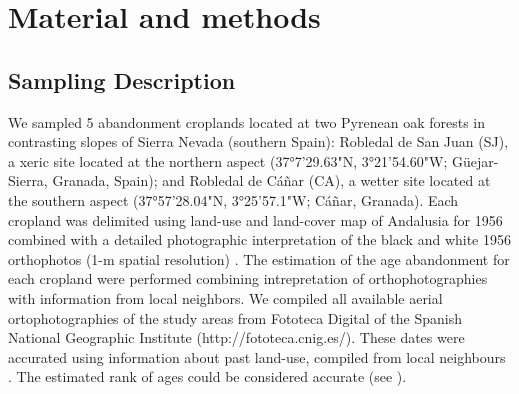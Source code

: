 \section{Material and methods}\label{sec:coloniza:MatMet}
\subsection{Sampling Description}\label{sec:coloniza:sampling}

\begin{table}
\caption{Abandonment cropland features}
\centering
{}
\label{tab:coloniza:croplands}
\end{table}

We sampled 5 abandonment croplands located at two Pyrenean oak forests in contrasting slopes of Sierra Nevada (southern Spain): Robledal de San Juan (SJ), a xeric site located at the northern aspect (37°7'29.63"N, 3°21'54.60"W; Güejar-Sierra, Granada, Spain); and Robledal de Cáñar (CA), a wetter site located at the southern aspect (37°57'28.04"N, 3°25'57.1"W; Cáñar, Granada). Each cropland was delimited using land-use and land-cover map of Andalusia for 1956 \autocites[][]{CMA2007MapaUsos} combined with a detailed photographic interpretation of the black and white 1956 orthophotos (1-m spatial resolution) \autocites[see][for more details]{NavarroGonzalezetal2012CartografiaHistorica}. The estimation of the age abandonment for each cropland were performed combining intrepretation of orthophotographies with information from local neighbors. We compiled all available aerial ortophotographies of the study areas from Fototeca Digital of the Spanish National Geographic Institute (http://fototeca.cnig.es/). These dates were accurated using information about past land-use, compiled from local neighbours \autocites[by local workshops and interviews with retired elder: farmers, shepherds and loggers; see details in ][]{MorenoLlorcaetal2014CaracterizacionFuentes,MorenoLlorcaetal2016HistoricalAnalysis}. The estimated rank of ages could be considered accurate (see ).

